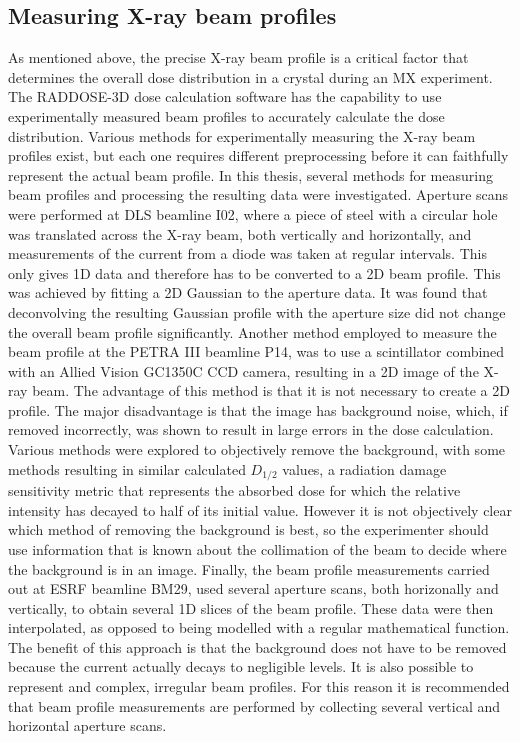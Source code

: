 \subsection{Measuring X-ray beam profiles}
\label{sub:Measuring X-ray Beam profiles}
As mentioned above, the precise X-ray beam profile is a critical factor that determines the overall dose distribution in a crystal during an MX experiment.
The RADDOSE-3D dose calculation software has the capability to use experimentally measured beam profiles to accurately calculate the dose distribution.
Various methods for experimentally measuring the X-ray beam profiles exist, but each one requires different preprocessing before it can faithfully represent the actual beam profile.
In this thesis, several methods for measuring beam profiles and processing the resulting data were investigated.
Aperture scans were performed at DLS beamline I02, where a piece of steel with a circular hole was translated across the X-ray beam, both vertically and horizontally, and measurements of the current from a diode was taken at regular intervals.
This only gives 1D data and therefore has to be converted to a 2D beam profile.
This was achieved by fitting a 2D Gaussian to the aperture data.
It was found that deconvolving the resulting Gaussian profile with the aperture size did not change the overall beam profile significantly.
Another method employed to measure the beam profile at the PETRA III beamline P14, was to use a scintillator combined with an Allied Vision GC1350C CCD camera, resulting in a 2D image of the X-ray beam.
The advantage of this method is that it is not necessary to create a 2D profile.
The major disadvantage is that the image has background noise, which, if removed incorrectly, was shown to result in large errors in the dose calculation.
Various methods were explored to objectively remove the background, with some methods resulting in similar calculated $D_{1/2}$ values, a radiation damage sensitivity metric that represents the absorbed dose for which the relative intensity has decayed to half of its initial value.
However it is not objectively clear which method of removing the background is best, so the experimenter should use information that is known about the collimation of the beam to decide where the background is in an image.
Finally, the beam profile measurements carried out at ESRF beamline BM29, used several aperture scans, both horizonally and vertically, to obtain several 1D slices of the beam profile.
These data were then interpolated, as opposed to being modelled with a regular mathematical function.
The benefit of this approach is that the background does not have to be removed because the current actually decays to negligible levels.
It is also possible to represent and complex, irregular beam profiles.
For this reason it is recommended that beam profile measurements are performed by collecting several vertical and horizontal aperture scans.

